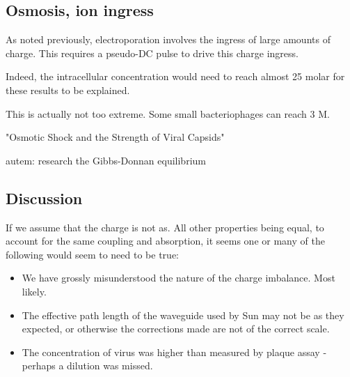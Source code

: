 \documentclass[paper.tex]{subfiles}
\begin{document}
\subsection{Osmosis, ion ingress}

As noted previously, electroporation involves the ingress of large amounts of charge. This requires a pseudo-DC pulse to drive this charge ingress.



Indeed, the intracellular concentration would need to reach almost 25 molar for these results to be explained.

This is actually not too extreme. Some small bacteriophages can reach 3 M.

"Osmotic Shock and the Strength of Viral Capsids"




\begin{autem}
	autem: research the Gibbs-Donnan equilibrium
\end{autem}


\subsection{Discussion}

If we assume that the charge is not as. All other properties being equal, to account for the same coupling and absorption, it seems one or many of the following would seem to need to be true:

\begin{itemize}
\item We have grossly misunderstood the nature of the charge imbalance. Most likely.
\item The effective path length of the waveguide used by Sun may not be as they expected, or otherwise the corrections made are not of the correct scale.
\item The concentration of virus was higher than measured by plaque assay - perhaps a dilution was missed.
\end{itemize}
\end{document}
